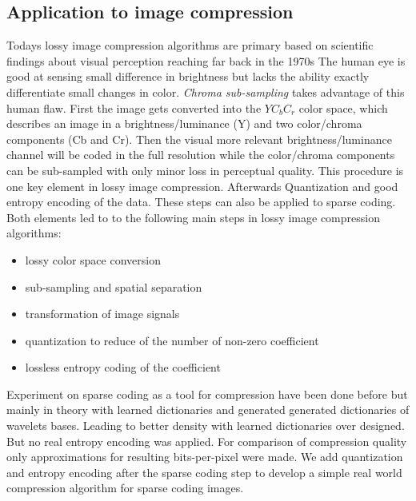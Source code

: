 \subsection{Application to image compression}
\label{sec:compression}
Todays lossy image compression algorithms are primary based on scientific
findings about visual perception reaching far back in the 1970s\cite{?}
The human eye is good at sensing small difference in brightness but lacks the
ability exactly differentiate small changes in color. \emph{Chroma sub-sampling}
takes advantage of this human flaw. First the image gets converted into the
$YC_bC_r$ color space, which describes an image in a brightness/luminance (Y)
and two color/chroma components (Cb and Cr). Then the visual more relevant
brightness/luminance channel will be coded in the full resolution while the
color/chroma components can be sub-sampled with only minor loss in perceptual
quality. This procedure
is one key element in lossy image compression. 
Afterwards 
Quantization and good entropy encoding of the data.
These steps can also be applied to sparse coding. Both elements
led to to the following main steps in lossy image compression algorithms:
\begin{itemize}
 \item lossy color space conversion
 \item sub-sampling and spatial separation
 \item transformation of image signals
 \item quantization to reduce of the number of non-zero coefficient 
 \item lossless entropy coding of the coefficient 
\end{itemize}


Experiment on sparse coding as a tool for compression have been done
before\cite{Lewicki1999,?} but mainly in theory with learned dictionaries and
generated generated dictionaries of wavelets bases. Leading to better density
with learned dictionaries over designed. But no real entropy encoding was
applied. For comparison of compression quality only approximations for
resulting bits-per-pixel were made. We add quantization and entropy encoding
after the sparse coding step to develop a simple real world compression
algorithm for sparse coding images.


